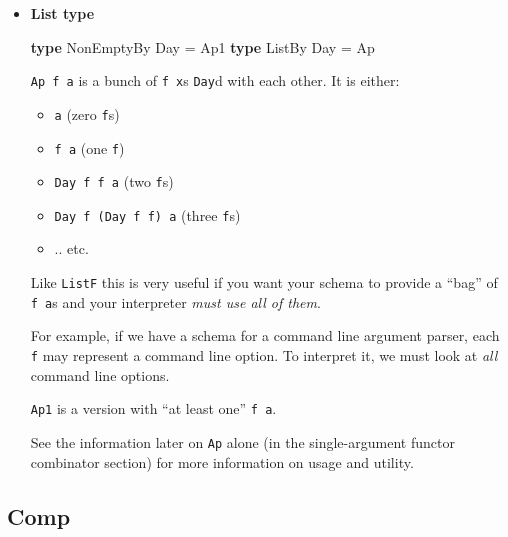 \documentclass[]{article}
\newenvironment{Shaded}{}{}
\newcommand{\DataTypeTok}[1]{\textcolor[rgb]{0.56,0.13,0.00}{#1}}
\newcommand{\KeywordTok}[1]{\textcolor[rgb]{0.00,0.44,0.13}{\textbf{#1}}}
\newcommand{\OtherTok}[1]{\textcolor[rgb]{0.00,0.44,0.13}{#1}}
\renewcommand{\href}[2]{#2\footnote{\url{#1}}}
\begin{document}
\begin{itemize}
  \texttt{Apply}, from
  \emph{\href{https://hackage.haskell.org/package/semigroupoids/docs/Data-Functor-Apply.html}{Data.Functor.Apply}}
  in \emph{semigroupoids}, is ``\texttt{Applicative} without \texttt{pure}''; it
  only has \texttt{\textless{}*\textgreater{}} (called
  \texttt{\textless{}.\textgreater{}}).

  \texttt{pureT} is essentially
  \texttt{pure\ ::\ Applicative\ h\ =\textgreater{}\ a\ -\textgreater{}\ h\ a}.
\item
  \textbf{List type}

\begin{Shaded}
\begin{Highlighting}[]
\KeywordTok{type} \DataTypeTok{NonEmptyBy} \DataTypeTok{Day} \OtherTok{=} \DataTypeTok{Ap1}
\KeywordTok{type} \DataTypeTok{ListBy}     \DataTypeTok{Day} \OtherTok{=} \DataTypeTok{Ap}
\end{Highlighting}
\end{Shaded}

  \texttt{Ap\ f\ a} is a bunch of \texttt{f\ x}s \texttt{Day}d with each other.
  It is either:

  \begin{itemize}
  \tightlist
  \item
    \texttt{a} (zero \texttt{f}s)
  \item
    \texttt{f\ a} (one \texttt{f})
  \item
    \texttt{Day\ f\ f\ a} (two \texttt{f}s)
  \item
    \texttt{Day\ f\ (Day\ f\ f)\ a} (three \texttt{f}s)
  \item
    .. etc.
  \end{itemize}

  Like \texttt{ListF} this is very useful if you want your schema to provide a
  ``bag'' of \texttt{f\ a}s and your interpreter \emph{must use all of them}.

  For example, if we have a schema for a command line argument parser, each
  \texttt{f} may represent a command line option. To interpret it, we must look
  at \emph{all} command line options.

  \texttt{Ap1} is a version with ``at least one'' \texttt{f\ a}.

  See the information later on \texttt{Ap} alone (in the single-argument functor
  combinator section) for more information on usage and utility.
\end{itemize}

\hypertarget{comp}{%
\subsection{Comp}\label{comp}}
\end{document}
